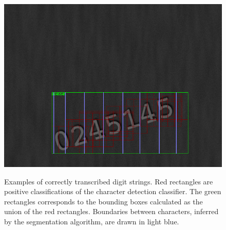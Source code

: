\documentclass[12pt]{article}
\begin{document}
\begin{figure}[b!]
{        \includegraphics[width=0.35\linewidth]{fig/good_examples_pipeline/c572f505-791b-45be-bf60-9761fd9eb1b6}
    }
    \caption{Examples of correctly transcribed digit strings. Red rectangles are positive classifications of the
    character detection classifier. The green rectangles corresponds to the bounding boxes calculated as the union
    of the red rectangles. Boundaries between characters, inferred by the segmentation algorithm, are drawn in light blue.}
    \label{fig:good_examples_pipeline}
\end{figure}
\end{document}
